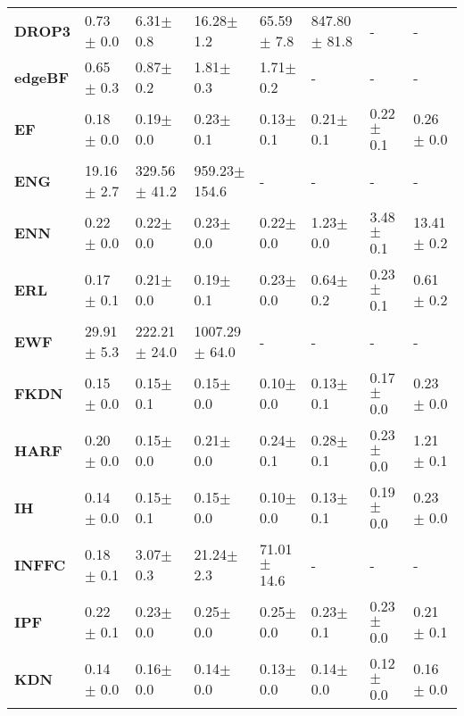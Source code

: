\begin{tabular}{llllllll}
\textbf{DROP3           } &   0.73$\pm$ 0.0 &     6.31$\pm$ 0.8 &     16.28$\pm$ 1.2 &   65.59$\pm$ 7.8 &  847.80$\pm$ 81.8 &                 - &                 - \\
\textbf{edgeBF          } &   0.65$\pm$ 0.3 &     0.87$\pm$ 0.2 &      1.81$\pm$ 0.3 &    1.71$\pm$ 0.2 &                 - &                 - &                 - \\
\textbf{EF              } &   0.18$\pm$ 0.0 &     0.19$\pm$ 0.0 &      0.23$\pm$ 0.1 &    0.13$\pm$ 0.1 &     0.21$\pm$ 0.1 &     0.22$\pm$ 0.1 &     0.26$\pm$ 0.0 \\
\textbf{ENG             } &  19.16$\pm$ 2.7 &  329.56$\pm$ 41.2 &  959.23$\pm$ 154.6 &                - &                 - &                 - &                 - \\
\textbf{ENN             } &   0.22$\pm$ 0.0 &     0.22$\pm$ 0.0 &      0.23$\pm$ 0.0 &    0.22$\pm$ 0.0 &     1.23$\pm$ 0.0 &     3.48$\pm$ 0.1 &    13.41$\pm$ 0.2 \\
\textbf{ERL             } &   0.17$\pm$ 0.1 &     0.21$\pm$ 0.0 &      0.19$\pm$ 0.1 &    0.23$\pm$ 0.0 &     0.64$\pm$ 0.2 &     0.23$\pm$ 0.1 &     0.61$\pm$ 0.2 \\
\textbf{EWF             } &  29.91$\pm$ 5.3 &  222.21$\pm$ 24.0 &  1007.29$\pm$ 64.0 &                - &                 - &                 - &                 - \\
\textbf{FKDN            } &   0.15$\pm$ 0.0 &     0.15$\pm$ 0.1 &      0.15$\pm$ 0.0 &    0.10$\pm$ 0.0 &     0.13$\pm$ 0.1 &     0.17$\pm$ 0.0 &     0.23$\pm$ 0.0 \\
\textbf{HARF            } &   0.20$\pm$ 0.0 &     0.15$\pm$ 0.0 &      0.21$\pm$ 0.0 &    0.24$\pm$ 0.1 &     0.28$\pm$ 0.1 &     0.23$\pm$ 0.0 &     1.21$\pm$ 0.1 \\
\textbf{IH              } &   0.14$\pm$ 0.0 &     0.15$\pm$ 0.1 &      0.15$\pm$ 0.0 &    0.10$\pm$ 0.0 &     0.13$\pm$ 0.1 &     0.19$\pm$ 0.0 &     0.23$\pm$ 0.0 \\
\textbf{INFFC           } &   0.18$\pm$ 0.1 &     3.07$\pm$ 0.3 &     21.24$\pm$ 2.3 &  71.01$\pm$ 14.6 &                 - &                 - &                 - \\
\textbf{IPF             } &   0.22$\pm$ 0.1 &     0.23$\pm$ 0.0 &      0.25$\pm$ 0.0 &    0.25$\pm$ 0.0 &     0.23$\pm$ 0.1 &     0.23$\pm$ 0.0 &     0.21$\pm$ 0.1 \\
\textbf{KDN             } &   0.14$\pm$ 0.0 &     0.16$\pm$ 0.0 &      0.14$\pm$ 0.0 &    0.13$\pm$ 0.0 &     0.14$\pm$ 0.0 &     0.12$\pm$ 0.0 &     0.16$\pm$ 0.0 \\

\end{tabular}
